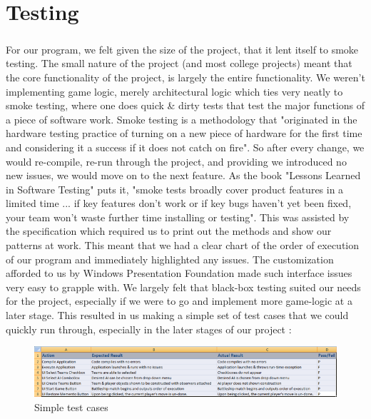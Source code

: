\chapter{Testing}
	\vspace{3mm}
	\begin{multicols}{2}
	\paragraph{}
		For our program, we felt given the size of the project, that it lent itself to smoke testing. The small nature of the project 
		(and most college projects) meant that the core functionality of the project, is largely the entire functionality.
		\newline
		\newline
		We weren’t implementing game logic, merely architectural logic which ties very neatly to smoke testing, where one does quick \& dirty 
		tests that test the major functions of a piece of software work.  Smoke testing is a methodology that "originated in the hardware 
		testing practice of turning on a new piece of hardware for the first time and considering it a success if it does not catch on fire".
		\newline
		\newline
		So after every change, we would re-compile, re-run through the project, and providing we introduced no new issues, we would move on to 
		the next feature.  As the book "Lessons Learned in Software Testing"\cite{lessons} puts it, 
		"smoke tests broadly cover product features in a limited time  ... if key features don't work or if key bugs haven't yet been fixed, your team won't waste further time installing or testing".
		\newline
		\newline
		This was assisted by the specification which required us to print out the methods and show our patterns at work. This meant that 
		we had a clear chart of the order of execution of our program and immediately highlighted any issues. The customization afforded 
		to us by Windows Presentation Foundation made such interface issues very easy to grapple with.
		\newline
		\newline
		We largely felt that black-box testing suited our needs for the project, especially if we were to go and implement more game-logic 
		at a later stage. This resulted in us making a simple set of test cases that we could quickly run through, especially in the later 
		stages of our project :

	\end{multicols}
		
		\begin{figure}[h!]
			\centering
			\includegraphics[width=120mm]{figures/st.png}
			  \caption{Simple test cases}
		\end{figure}


